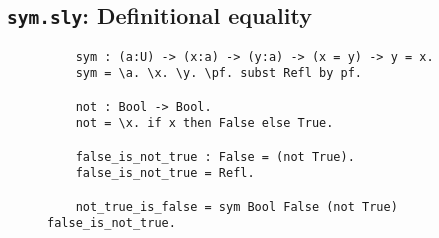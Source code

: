 \subsection{\texttt{sym.sly}: Definitional equality}
\begin{figure}[h!]
\begin{lstlisting}
    sym : (a:U) -> (x:a) -> (y:a) -> (x = y) -> y = x.
    sym = \a. \x. \y. \pf. subst Refl by pf.

    not : Bool -> Bool.
    not = \x. if x then False else True.

    false_is_not_true : False = (not True).
    false_is_not_true = Refl.

    not_true_is_false = sym Bool False (not True) false_is_not_true.
\end{lstlisting}
\end{figure}
